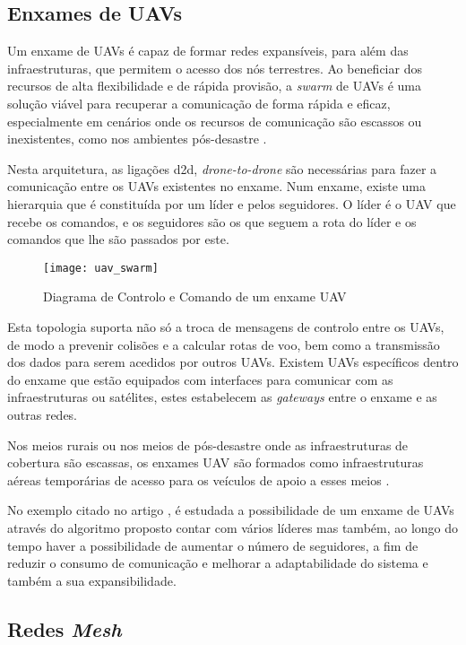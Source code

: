 \subsection{Enxames de UAVs}

Um enxame de UAVs é capaz de formar redes expansíveis, para além das infraestruturas, que permitem o acesso dos nós terrestres. Ao beneficiar dos recursos de alta flexibilidade e de rápida provisão, a \textit{swarm} de UAVs é uma solução viável para recuperar a comunicação de forma rápida e eficaz, especialmente em cenários onde os recursos de comunicação são escassos ou inexistentes, como nos ambientes pós-desastre \cite{Shi2018}. 

Nesta arquitetura, as ligações d2d, \textit{drone-to-drone} são necessárias para fazer a comunicação entre os UAVs existentes no enxame. Num enxame, existe uma hierarquia que é constituída por um líder e pelos seguidores. O líder é o UAV que recebe os comandos, e os seguidores são os que seguem a rota do líder e os comandos que lhe são passados por este.

\begin{figure}[H]
\centering
\texttt{[image: uav\_swarm]}
\caption{Diagrama de Controlo e Comando de um enxame UAV\label{fig:uav_swarm} }\cite{G.Madey2013}
\end{figure}

Esta topologia suporta não só a troca de mensagens de controlo entre os UAVs, de modo a prevenir colisões e a calcular rotas de voo,  bem como a transmissão dos dados para serem acedidos por outros UAVs. Existem UAVs específicos dentro do enxame que estão equipados com interfaces para comunicar com as infraestruturas ou satélites, estes estabelecem as \textit{gateways} entre o enxame e as outras redes.

Nos meios rurais ou nos meios de pós-desastre onde as infraestruturas de cobertura são escassas, os enxames UAV são formados como infraestruturas aéreas temporárias de acesso para os veículos de apoio a esses meios \cite{Shi2018}.

No exemplo citado no artigo \cite{He2018}, é estudada a possibilidade de um enxame de UAVs através do algoritmo proposto contar com vários líderes mas também, ao longo do tempo haver a possibilidade de aumentar o número de seguidores, a fim de reduzir o consumo de comunicação e melhorar a adaptabilidade do sistema e também a sua expansibilidade.

\subsection{Redes \textit{Mesh}}

